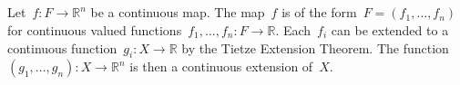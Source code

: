 \subsection{}

Let~$f \colon F \to ℝ^n$ be a continuous map.
The map~$f$ is of the form~$F = (f_1, \dotsc, f_n)$ for continuous valued functions~$f_1, \dotsc, f_n \colon F \to ℝ$.
Each~$f_i$ can be extended to a continuous function~$g_i \colon X \to ℝ$ by the Tietze Extension Theorem.
The function~$(g_1, \dotsc, g_n) \colon X \to ℝ^n$ is then a continuous extension of~$X$.

